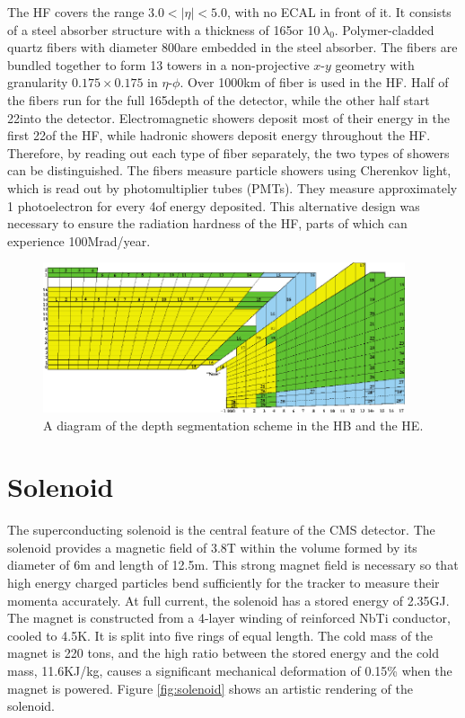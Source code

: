The HF covers the range $3.0<|\eta|<5.0$, with no ECAL in front of it. It consists of a steel absorber structure with a thickness of 165\cm or 10$\,\lambda_{0}$. Polymer-cladded quartz fibers with diameter 800\mum are embedded in the steel absorber. The fibers are bundled together to form 13 towers in a non-projective $x$-$y$ geometry with granularity $0.175\times0.175$ in $\eta$-$\phi$. Over 1000\unit{km} of fiber is used in the HF. Half of the fibers run for the full 165\cm depth of the detector, while the other half start 22\cm into the detector. Electromagnetic showers deposit most of their energy in the first 22\cm of the HF, while hadronic showers deposit energy throughout the HF. Therefore, by reading out each type of fiber separately, the two types of showers can be distinguished. The fibers measure particle showers using Cherenkov light, which is read out by photomultiplier tubes (PMTs). They measure approximately 1 photoelectron for every 4\GeV of energy deposited. This alternative design was necessary to ensure the radiation hardness of the HF, parts of which can experience 100\unit{Mrad/year}.

\begin{figure}[hbt]
\begin{center}
\includegraphics[width=0.95\textwidth]{figures/HCAL_tower_segmentation.pdf}
\caption{A diagram of the depth segmentation scheme in the HB and the HE.}
\label{fig:hcal-depths}
\end{center}
\end{figure}


\section{Solenoid}

The superconducting solenoid is the central feature of the CMS detector. The solenoid provides a magnetic field of 3.8\unit{T} within the volume formed by its diameter of 6\unit{m} and length of 12.5\unit{m}. This strong magnet field is necessary so that high energy charged particles bend sufficiently for the tracker to measure their momenta accurately. At full current, the solenoid has a stored energy of 2.35\unit{GJ}. The magnet is constructed from a 4-layer winding of reinforced NbTi conductor, cooled to 4.5\unit{K}. It is split into five rings of equal length. The cold mass of the magnet is 220 tons, and the high ratio between the stored energy and the cold mass, 11.6\unit{KJ/kg}, causes a significant mechanical deformation of 0.15\% when the magnet is powered. Figure \ref{fig:solenoid} shows an artistic rendering of the solenoid.

